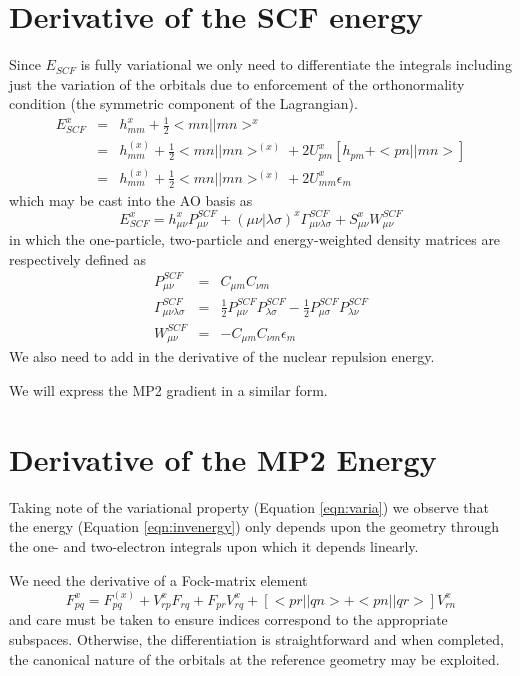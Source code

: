 \documentclass[fleqn,12pt]{article}
\newcommand{\half}{\frac{1}{2}}
\newcommand{\bra}{<\!}
\newcommand{\ket}{\!>}
\newcommand{\Fx}{F^{(x)}}
\begin{document}
\section{Derivative of the SCF energy}

Since $E_{SCF}$ is fully variational we only need to differentiate the
integrals including just the variation of the orbitals due to
enforcement of the orthonormality condition (the symmetric component
of the Lagrangian).
\begin{eqnarray}
  E_{SCF}^x & = & h_{mm}^x + \half \bra mn||mn \ket^x \\
  & = & h_{mm}^{(x)} + \half \bra mn||mn \ket^{(x)} 
       + 2 U^x_{pm} \left[ h_{pm} + \bra pn||mn \ket \right] \\
  & = & h_{mm}^{(x)} + \half \bra mn||mn \ket^{(x)} + 2 U^x_{mm}
  \epsilon_m 
\end{eqnarray}
which may be cast into the AO basis as
\begin{equation}
\label{eqn:scfderiv}
  E_{SCF}^x = h^x_{\mu \nu} P^{SCF}_{\mu \nu} + 
     (\mu \nu | \lambda \sigma)^x \Gamma^{SCF}_{\mu \nu \lambda \sigma} +
     S^x_{\mu \nu} W^{SCF}_{\mu \nu}
\end{equation}
in which the one-particle, two-particle and energy-weighted density
matrices are respectively defined as
\begin{eqnarray}
  P^{SCF}_{\mu\nu} & = & C_{\mu m} C_{\nu m} \label{eqn:pscf}\\
  \Gamma^{SCF}_{\mu\nu\lambda\sigma} & = & 
    \half P^{SCF}_{\mu\nu}P^{SCF}_{\lambda\sigma} - 
    \half P^{SCF}_{\mu\sigma}P^{SCF}_{\lambda\nu} \\
  W^{SCF}_{\mu\nu} & = & - C_{\mu m} C_{\nu m} \epsilon_m \label{eqn:wscf}
\end{eqnarray}
We also need to add in the derivative of the nuclear repulsion energy.

We will express the MP2 gradient in a similar form.


\section{Derivative of the MP2 Energy}

Taking note of the variational property (Equation \ref{eqn:varia}) we
observe that the energy (Equation \ref{eqn:invenergy}) only depends
upon the geometry through the one- and two-electron integrals upon
which it depends linearly.  

We need the derivative of a Fock-matrix element
\begin{equation}
  F^x_{pq} = \Fx_{pq} + V^x_{rp}F_{rq} + F_{pr}V^x_{rq} +
  \left[ \bra pr||qn \ket + \bra pn || qr \ket \right] V^x_{rn}
\end{equation}
and care must be taken to ensure indices correspond to the appropriate
subspaces.  Otherwise, the differentiation is straightforward and when
completed, the canonical nature of the orbitals at the reference
geometry may be exploited.
\end{document}
